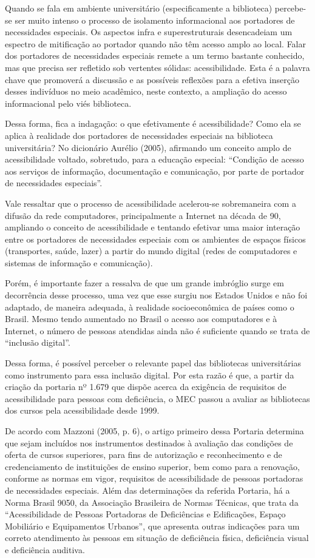 	Quando se fala em ambiente universitário (especificamente a biblioteca) percebe-se ser muito intenso o processo de isolamento informacional aos portadores de necessidades especiais. Os aspectos infra e superestruturais desencadeiam um espectro de mitificação ao portador quando não têm acesso amplo ao local.
Falar dos portadores de necessidades especiais remete a um termo bastante conhecido, mas que precisa ser refletido sob vertentes sólidas: acessibilidade. Esta é a palavra chave que promoverá a discussão e as possíveis reflexões para a efetiva inserção desses indivíduos no meio acadêmico, neste contexto, a ampliação do acesso informacional pelo viés biblioteca.

	Dessa forma, fica a indagação: o que efetivamente é acessibilidade? Como ela se aplica à realidade dos portadores de necessidades especiais na biblioteca universitária? No dicionário Aurélio (2005), afirmando um conceito amplo de acessibilidade voltado, sobretudo, para a educação especial: ``Condição de acesso aos serviços de informação, documentação e comunicação, por parte de portador de necessidades especiais''.

	Vale ressaltar que o processo de acessibilidade acelerou-se sobremaneira com a difusão da rede computadores, principalmente a Internet na década de 90, ampliando o conceito de acessibilidade e tentando efetivar uma maior interação entre os portadores de necessidades especiais com os ambientes de espaços físicos (transportes, saúde, lazer) a partir do mundo digital (redes de computadores e sistemas de informação e comunicação).

	Porém, é importante fazer a ressalva de que um grande imbróglio surge em decorrência desse processo, uma vez que esse surgiu nos Estados Unidos e não foi adaptado, de maneira adequada, à realidade socioeconômica de países como o Brasil. Mesmo tendo aumentado no Brasil o acesso aos computadores e à Internet, o número de pessoas atendidas ainda não é suficiente quando se trata de ``inclusão digital''.

	Dessa forma, é possível perceber o relevante papel das bibliotecas universitárias como instrumento para essa inclusão digital. Por esta razão é que, a partir da criação da portaria nº 1.679 que dispõe acerca da exigência de requisitos de acessibilidade para pessoas com deficiência, o MEC passou a avaliar as bibliotecas dos cursos pela acessibilidade desde 1999.

	De acordo com Mazzoni (2005, p. 6), o artigo primeiro dessa Portaria determina que sejam incluídos nos instrumentos destinados à avaliação das condições de oferta de cursos superiores, para fins de autorização e reconhecimento e de credenciamento de instituições de ensino superior, bem como para a renovação, conforme as normas em vigor, requisitos de acessibilidade de pessoas portadoras de necessidades especiais. Além das determinações da referida Portaria, há a Norma Brasil 9050, da Associação Brasileira de Normas Técnicas, que trata da “Acessibilidade de Pessoas Portadoras de Deficiências e Edificações, Espaço Mobiliário e Equipamentos Urbanos”, que apresenta outras indicações para um correto atendimento às pessoas em situação de deficiência física, deficiência visual e deficiência auditiva.

